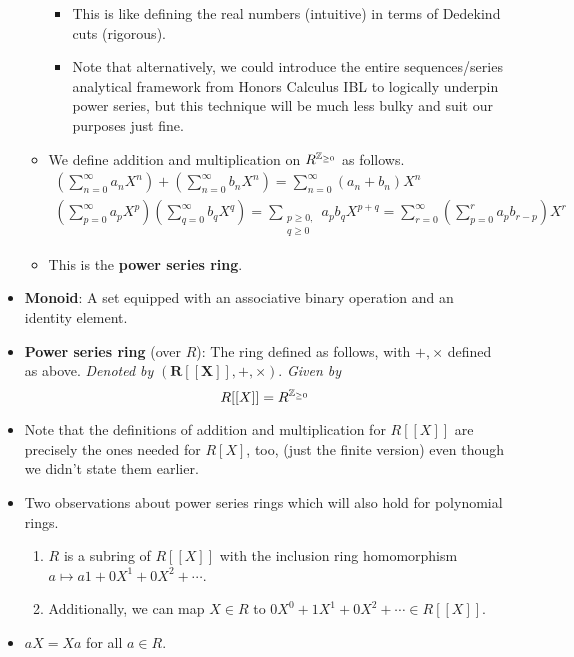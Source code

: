 \documentclass[../notes.tex]{subfiles}
\begin{document}
\begin{itemize}
\begin{itemize}
\begin{itemize}
            \item This is like defining the real numbers (intuitive) in terms of Dedekind cuts (rigorous).
            \item Note that alternatively, we could introduce the entire sequences/series analytical framework from Honors Calculus IBL to logically underpin power series, but this technique will be much less bulky and suit our purposes just fine.
        \end{itemize}
        \item We define addition and multiplication on $R^{\mathbb{Z}_{\geq 0}}$ as follows.
        \begin{gather*}
            \left( \sum_{n=0}^\infty a_nX^n \right)+\left( \sum_{n=0}^\infty b_nX^n \right) = \sum_{n=0}^\infty(a_n+b_n)X^n\\
            \left( \sum_{p=0}^\infty a_pX^p \right)\left( \sum_{q=0}^\infty b_qX^q \right) = \sum_{\substack{p\geq 0,\\ q\geq 0}}a_pb_qX^{p+q}
                = \sum_{r=0}^\infty\left( \sum_{p=0}^ra_pb_{r-p} \right)X^r
        \end{gather*}
        \item This is the \textbf{power series ring}.
    \end{itemize}
    \item \textbf{Monoid}: A set equipped with an associative binary operation and an identity element.
    \item \textbf{Power series ring} (over $R$): The ring defined as follows, with $+,\times$ defined as above. \emph{Denoted by} $\bm{(R[[X]],+,\times)}$. \emph{Given by}
    \begin{equation*}
        R[[X]] = R^{\mathbb{Z}_{\geq 0}}
    \end{equation*}
    \item Note that the definitions of addition and multiplication for $R[[X]]$ are precisely the ones needed for $R[X]$, too, (just the finite version) even though we didn't state them earlier.
    \item Two observations about power series rings which will also hold for polynomial rings.
    \begin{enumerate}
        \item $R$ is a subring of $R[[X]]$ with the inclusion ring homomorphism $a\mapsto a1+0X^1+0X^2+\cdots$.
        \item Additionally, we can map $X\in R$ to $0X^0+1X^1+0X^2+\cdots\in R[[X]]$.
    \end{enumerate}
    \item $aX=Xa$ for all $a\in R$.

\end{itemize}
\end{document}
